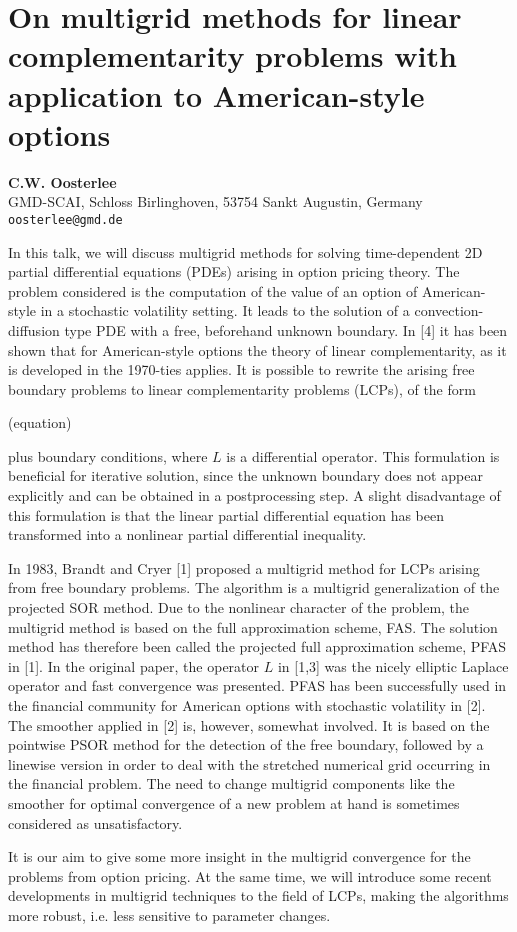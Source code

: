 \documentclass[11pt]{article}
\newcommand{\nextab}[4]{
	\section{#2}
	{\bf #1} \\ \nopagebreak
	{#3} \\ \nopagebreak
	{\tt #4} \nopagebreak
	}
\begin{document}
\nextab
{C.W. Oosterlee}
{On multigrid methods for linear complementarity problems with application to American-style options}
{GMD-SCAI, Schloss Birlinghoven, 53754 Sankt Augustin, Germany}
{oosterlee@gmd.de}


In this talk, we will discuss multigrid methods for solving
time-dependent 2D partial differential equations (PDEs)
arising in option pricing theory.  The problem considered
is the computation of the value of an option of
American-style in a stochastic volatility setting. It leads
to the solution of a convection-diffusion type PDE
with a free, beforehand unknown boundary.
In [4] it has been shown that
for American-style options the theory of linear
complementarity, as it is developed in the 1970-ties
applies.  It is possible to rewrite the arising free
boundary problems to linear complementarity problems
(LCPs), of the form
\centerline{(equation)}
plus boundary
conditions, where $L$ is a differential operator.  This
formulation is beneficial for iterative solution, since the
unknown boundary does not appear explicitly and can be
obtained in a postprocessing step.  A slight disadvantage
of this formulation is that the linear partial differential
equation has been transformed into a nonlinear partial
differential inequality.


In 1983, Brandt and Cryer [1] proposed a multigrid method
for LCPs arising from free boundary problems.  The
algorithm is a multigrid generalization of the projected
SOR method. Due to the nonlinear character of the problem,
the multigrid method is based on the full approximation
scheme, FAS.  The solution method has therefore been called
the projected full approximation scheme, PFAS in [1].  In
the original paper, the operator $L$ in [1,3] was the
nicely elliptic Laplace operator and fast convergence was
presented.  PFAS has been successfully used in the
financial community for American options with stochastic
volatility in [2].  The smoother applied in [2] is,
however, somewhat involved.  It is based on the pointwise
PSOR method for the detection of the free boundary,
followed by a linewise version in order to deal with the
stretched numerical grid occurring in the financial
problem.  The need to change multigrid components like the
smoother for optimal convergence of a new problem at hand
is sometimes considered as unsatisfactory.

It is our aim to give some more insight in the multigrid
convergence for the problems from option pricing. At the
same time, we will introduce some recent developments in
multigrid techniques to the field of LCPs, making the
algorithms more robust, i.e. less sensitive to parameter
changes.
\end{document}
